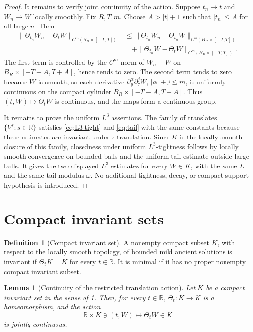 \documentclass[11pt]{amsart}
\theoremstyle{plain}
\newtheorem{lemma}[theorem]{Lemma}
\theoremstyle{definition}
\newtheorem{definition}[theorem]{Definition}
\theoremstyle{remark}
\numberwithin{equation}{section}
\begin{document}
\begin{proof}
It remains to verify joint continuity of the action.  Suppose \(t_n\to t\) and
\(W_n\to W\) locally smoothly.  Fix \(R,T,m\).  Choose \(A>|t|+1\) such that
\(|t_n|\le A\) for all large \(n\).  Then
\begin{align*}
   \|\Theta_{t_n}W_n-\Theta_tW\|_{C^m(B_R\times[-T,T])}
   &\le
   \|\Theta_{t_n}W_n-\Theta_{t_n}W\|_{C^m(B_R\times[-T,T])}
   \\
   &\quad+
   \|\Theta_{t_n}W-\Theta_tW\|_{C^m(B_R\times[-T,T])}.
\end{align*}
The first term is controlled by the \(C^m\)-norm of \(W_n-W\) on
\(B_R\times[-T-A,T+A]\), hence tends to zero.  The second term tends to zero
because \(W\) is smooth, so each derivative
\(\partial_y^\alpha\partial_\tau^jW\), \(|\alpha|+j\le m\), is uniformly
continuous on the compact cylinder \(B_R\times[-T-A,T+A]\).  Thus
\((t,W)\mapsto\Theta_tW\) is continuous, and the maps form a continuous group.

It remains to prove the uniform \(L^3\) assertions.  The family of translates
\(\{V^s:s\in\mathbb R\}\) satisfies \eqref{eq:L3-tight} and \eqref{eq:tail}
with the same constants because these estimates are invariant under
\(\tau\)-translation.  Since \(K\) is the locally smooth closure of this
family, closedness under uniform \(L^3\)-tightness follows by locally smooth
convergence on bounded balls and the uniform tail estimate outside large balls.
It gives the two displayed \(L^3\) estimates for every \(W\in K\), with the same
\(L\) and the same tail modulus \(\omega\).  No additional tightness, decay, or
compact-support hypothesis is introduced.
\end{proof}

\section{Compact invariant sets}

\begin{definition}[Compact invariant set]\label{def:compact-invariant}
A nonempty compact subset \(K\), with respect to the locally smooth topology,
of bounded mild ancient solutions is invariant if \(\Theta_tK=K\) for every
\(t\in\mathbb R\).  It is minimal if it has no proper nonempty compact
invariant subset.
\end{definition}

\begin{lemma}[Continuity of the restricted translation action]\label{lem:action-continuity}
Let \(K\) be a compact invariant set in the sense of
\cref{def:compact-invariant}.  Then, for every \(t\in\mathbb R\),
\(\Theta_t:K\to K\) is a homeomorphism, and the action
\[
   \mathbb R\times K\ni(t,W)\mapsto\Theta_tW\in K
\]
is jointly continuous.
\end{lemma}
\end{document}
